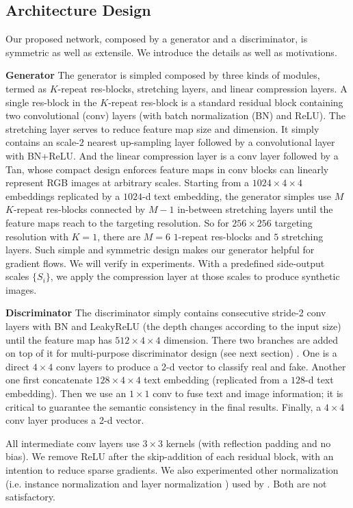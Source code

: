 \documentclass[10pt,twocolumn,letterpaper]{article}
\begin{document}
\subsection{Architecture Design}
Our proposed network, composed by a generator and a discriminator, is symmetric as well as extensile. We introduce the details as well as motivations.

\textbf{Generator} The generator is simpled composed by three kinds of modules, termed as $K$-repeat res-blocks, stretching layers, and linear compression layers.
A single res-block in the $K$-repeat res-block is a standard residual block  \cite{he2016identity} containing two convolutional (conv) layers (with batch normalization (BN) \cite{ioffe2015batch} and ReLU). The stretching layer serves to reduce feature map size and dimension. It simply contains an scale-$2$ nearest up-sampling layer followed by a convolutional layer with BN+ReLU. And the linear compression layer is a conv layer followed by a Tan, whose compact design enforces feature maps in conv blocks can linearly represent RGB images at arbitrary scales.
Starting from a $1024{\times}4{\times}4$ embeddings replicated by a $1024$-d text embedding, the generator simples use $M$ $K$-repeat res-blocks connected by $M{-}1$ in-between stretching layers until the feature maps reach to the targeting resolution. So for $256{\times}256$ targeting resolution with $K{=}1$, there are $M{=}6$ $1$-repeat res-blocks and $5$ stretching layers. Such simple and symmetric design makes our generator helpful for gradient flows. We will verify in experiments. 
With a predefined side-output scales $\{S_i\}$, we apply the compression layer at those scales to produce synthetic images.

\textbf{Discriminator} The discriminator simply contains consecutive stride-2 conv layers with BN and LeakyReLU \cite{} (the depth changes according to the input size) until the feature map has $512{\times}4{\times}4$ dimension. There two branches are added on top of it for multi-purpose discriminator design (see next section) . One is a direct $4{\times}4$ conv layers to produce a 2-d vector to classify real and fake. Another one first concatenate $128{\times}4{\times}4$ text embedding (replicated from a $128$-d text embedding). Then we use an $1{\times}1$ conv to fuse text and image information; it is critical to guarantee the semantic consistency in the final results. Finally, a $4{\times}4$ conv layer produces a 2-d vector.

All intermediate conv layers use $3{\times}3$ kernels (with reflection padding and no bias). We remove ReLU after the skip-addition of each residual block, with an intention to reduce sparse gradients. 
We also experimented other normalization (i.e. instance normalization \cite{ulyanov2016instance} and layer normalization \cite{ba2016layer}) used by \cite{zhu2017unpaired,chen2017photographic}. Both are not satisfactory. 
\end{document}
